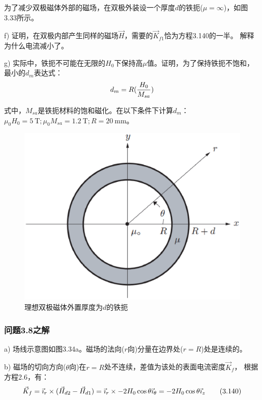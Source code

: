为了减少双极磁体外部的磁场，在双极外装设一个厚度$d$的铁扼($\mu=\infty$)，如图3.33所示。

f) 证明，在双极内部产生同样的磁场$\vec{H}$，需要的$\vec{K}_{f1}$恰为方程3.140的一半。
解释为什么电流减小了。

g) 实际中，铁扼不可能在无限的$H_0$下保持高$\mu$值。证明，为了保持铁扼不饱和，
最小的$d_m$表达式：
\begin{equation}
d_{m}=R(\frac{H_{0}}{M_{sa}})\\%
\end{equation}

式中，$M_{sa}$是铁扼材料的饱和磁化。在以下条件下计算$d_m$：$\mu_0 H_0=5\ \mathrm{T};\mu_0 M_{sa}=1.2\ \mathrm{T}; R=20\ \mathrm{mm}$。
\begin{figure}[htbp]
	\centering
	\includegraphics[scale=0.5]{chpt3/figs/fig3.33.eps}
	\caption{理想双极磁体外置厚度为$d$的铁扼}
\end{figure}

\subsubsection{问题3.8之解}
a) 场线示意图如图3.34a。磁场的法向($r$向)分量在边界处($r=R$)处是连续的。

b) 磁场的切向方向($\theta$向)在$r=R$处不连续，差值为该处的表面电流密度$\vec{K}_f$，
根据方程2.6，有：
\begin{equation*}
\vec{K}_{f}=\vec{\imath}_{r}\times(\vec{H}_{d2}-\vec{H}_{d1})=\vec{\imath}_{r}\times-2H_{0}\cos\theta\vec{\imath}_{\theta}\\
=-2H_{0}\cos\theta\vec{\imath}_{z}\tag{3.140}
\end{equation*}

